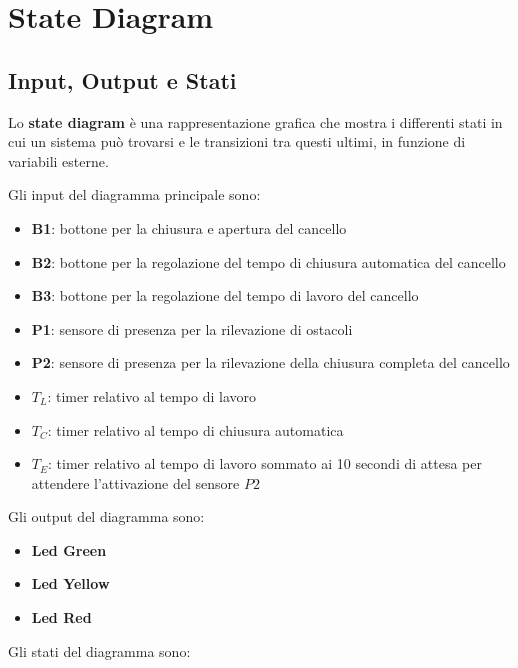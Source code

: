 \chapter{\bf{State Diagram}}
\boldmath

\section{Input, Output e Stati}

Lo \textbf{state diagram} è una rappresentazione grafica che mostra i differenti stati in cui un sistema può trovarsi e le transizioni tra questi ultimi, in funzione di variabili esterne.

\vspace{3mm}

\noindent Gli input del diagramma principale sono:

\begin{itemize}
    \item \textbf{B1}: bottone per la chiusura e apertura del cancello
    \item \textbf{B2}: bottone per la regolazione del tempo di chiusura automatica del cancello
    \item \textbf{B3}: bottone per la regolazione del tempo di lavoro del cancello
    \item \textbf{P1}: sensore di presenza per la rilevazione di ostacoli
    \item \textbf{P2}: sensore di presenza per la rilevazione della chiusura completa del cancello
    \item $T_L$: timer relativo al tempo di lavoro
    \item $T_C$: timer relativo al tempo di chiusura automatica
    \item $T_E$: timer relativo al tempo di lavoro sommato ai 10 secondi di attesa per attendere l'attivazione del sensore $P2$
\end{itemize}

\noindent Gli output del diagramma sono:

\begin{itemize}
    \item \textbf{Led Green}
    \item \textbf{Led Yellow}
    \item \textbf{Led Red}
\end{itemize}

\noindent Gli stati del diagramma sono:

